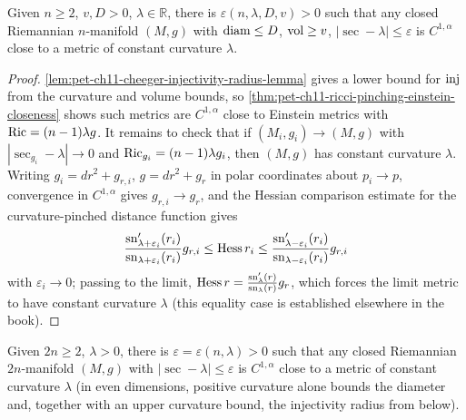 \begin{theorem}
  \label{thm:pet-ch11-sec-pinching-constant-curvature-closeness}
  Given $n\ge2$, $v,D>0$, $\lambda\in\mathbb{R}$, there is
  $\varepsilon(n,\lambda,D,v)>0$ such that any closed Riemannian $n$-manifold
  $(M,g)$ with $\operatorname{diam}\le D$, $\operatorname{vol}\ge v$, $|\sec-\lambda|\le\varepsilon$ is
  $C^{1,\alpha}$ close to a metric of constant curvature $\lambda$.
\end{theorem}
\begin{proof}
  \cref{lem:pet-ch11-cheeger-injectivity-radius-lemma} gives a lower bound
  for $\operatorname{inj}$ from the curvature and volume bounds, so
  \cref{thm:pet-ch11-ricci-pinching-einstein-closeness} shows such metrics
  are $C^{1,\alpha}$ close to Einstein metrics with $\operatorname{Ric}=(n-1)\lambda g$. It
  remains to check that if $(M_i,g_i)\to(M,g)$ with
  $|\sec_{g_i}-\lambda|\to0$ and $\operatorname{Ric}_{g_i}=(n-1)\lambda g_i$, then $(M,g)$
  has constant curvature $\lambda$. Writing $g_i=dr^2+g_{r,i}$,
  $g=dr^2+g_r$ in polar coordinates about $p_i\to p$, convergence in
  $C^{1,\alpha}$ gives $g_{r,i}\to g_r$, and the Hessian comparison estimate
  for the curvature-pinched distance function gives
  \[
    \frac{\mathrm{sn}_{\lambda+\varepsilon_i}'(r_i)}{\mathrm{sn}_{\lambda+\varepsilon_i}(r_i)}g_{r,i}
    \le\operatorname{Hess} r_i\le\frac{\mathrm{sn}_{\lambda-\varepsilon_i}'(r_i)}{\mathrm{sn}_{\lambda-\varepsilon_i}(r_i)}g_{r,i}
  \]
  with $\varepsilon_i\to0$; passing to the limit,
  $\operatorname{Hess} r=\frac{\mathrm{sn}_\lambda'(r)}{\mathrm{sn}_\lambda(r)}g_r$, which
  forces the limit metric to have constant curvature $\lambda$ (this
  equality case is established elsewhere in the book).
\end{proof}

\begin{corollary}
  \label{cor:pet-ch11-even-dim-positive-pinching}
  Given $2n\ge2$, $\lambda>0$, there is $\varepsilon=\varepsilon(n,\lambda)>0$
  such that any closed Riemannian $2n$-manifold $(M,g)$ with
  $|\sec-\lambda|\le\varepsilon$ is $C^{1,\alpha}$ close to a metric of
  constant curvature $\lambda$ (in even dimensions, positive curvature alone
  bounds the diameter and, together with an upper curvature bound, the
  injectivity radius from below).
\end{corollary}

